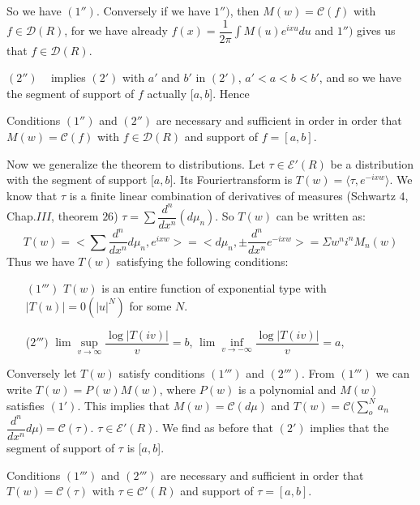  So we have $(1'')$. Conversely if we have $1'')$, then $M(w) =
 \mathscr{C}(f)$ with $f \in \mathscr{D} (R)$, for we have already
 $f(x) = \dfrac{1}{2 \pi} \int M(u) e^{ixu} du$ and $1'')$ gives us that
 $f \in \mathscr{D} (R)$. 

 $(2'')$ ~ implies $(2')$ with $a'$ and $b'$ in $(2')$, $a' < a < b < b'$,
 and so we have the segment of support of $f$ actually [$a, b$]. Hence 

\begin{theorem*}
 Conditions $(1'')$ and $(2'')$ are necessary and sufficient in order
 in order that $M(w) = \mathscr{C} (f)$ with $f \in \mathscr{D} (R)$
 and support of $f= [a, b]$.
\end{theorem*}

Now we generalize the theorem to distributions. Let $\tau \in
\mathscr{E}' (R)$ be a distribution with the segment of support [$a,
 b$]. Its 
Fourier\pageoriginale transform is $T(w) = \langle \tau, e^{-ixw} \rangle$. We know
that $\tau$ is a finite linear combination of derivatives of measures
(Schwartz $4$, Chap.$III$, theorem $26$) $\tau = \sum
\dfrac{d^n}{dx^n} (d \mu_n)$. So $T(w)$ can be written as: 
\begin{equation*}
 T(w) = <\sum \frac{d^n}{dx^n} d \mu_n, e^{ixw} > =
 < d \mu_n, \pm \frac{d^n}{dx^n} e^{-ixw} > =
 \Sigma w^n i^n M_n (w) 
\end{equation*}
Thus we have $T(w)$ satisfying the following conditions:

\begin{itemize}
\item[$(1''')$] $T(w)$ is an entire function of exponential type with
 $\big | T(u) \big | = 0 (| u |^N) $ for some $N$. 
\item[($2''')$] $\lim \sup\limits_{v \rightarrow \infty}\dfrac{\log
 \big| T(iv) \big|}{v} = b$, $\lim \inf\limits_{v \rightarrow-
 \infty}\dfrac{\log |T(iv)|}{v}= a$, 
\end{itemize}

Conversely let $T(w)$ satisfy conditions $(1''')$ and $(2''')$. From
$(1''')$ we can write $T(w) = P (w) M(w)$, where $P(w)$ is a
polynomial and $M(w)$ satisfies $(1')$. This implies that $M(w) =
\mathscr{C} (d \mu)$ and $T(w) = \mathscr{C} (\sum\limits^{N}_o a_n$ 
$\dfrac{d^n}{dx^n} d \mu ) = \mathscr{C} (\tau)$. $\tau \in
\mathscr{E}' (R)$. We find as before that $(2')$ implies that the
segment of support of $\tau$ is [$a, b$]. 

\begin{theorem*}
 Conditions $(1''')$ and $(2''')$ are necessary and sufficient in
 order that $T(w) = \mathscr{C}(\tau) $ with $\tau \in \mathscr{C}'
 (R)$ and support of $\tau = [a, b]$. 
\end{theorem*}

